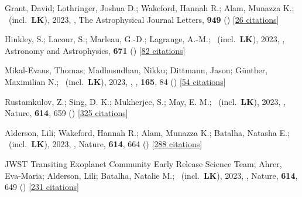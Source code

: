 \item[{\color{numcolor}\scriptsize87}] Grant, David; Lothringer, Joshua D.; Wakeford, Hannah R.; Alam, Munazza K.; \etal\ (incl.\ \textbf{LK}), 2023, , The Astrophysical Journal Letters, \textbf{949} () [\href{https://ui.adsabs.harvard.edu/abs/2023ApJ...949L..15G}{26 citations}]

\item[{\color{numcolor}\scriptsize86}] Hinkley, S.; Lacour, S.; Marleau, G.-D.; Lagrange, A.-M.; \etal\ (incl.\ \textbf{LK}), 2023, , Astronomy and Astrophysics, \textbf{671} () [\href{https://ui.adsabs.harvard.edu/abs/2023A&A...671L...5H}{82 citations}]

\item[{\color{numcolor}\scriptsize85}] Mikal-Evans, Thomas; Madhusudhan, Nikku; Dittmann, Jason; G{\"u}nther, Maximilian N.; \etal\ (incl.\ \textbf{LK}), 2023, , \aj, \textbf{165}, 84 () [\href{https://ui.adsabs.harvard.edu/abs/2023AJ....165...84M}{54 citations}]

\item[{\color{numcolor}\scriptsize84}] Rustamkulov, Z.; Sing, D. K.; Mukherjee, S.; May, E. M.; \etal\ (incl.\ \textbf{LK}), 2023, , Nature, \textbf{614}, 659 () [\href{https://ui.adsabs.harvard.edu/abs/2023Natur.614..659R}{325 citations}]

\item[{\color{numcolor}\scriptsize83}] Alderson, Lili; Wakeford, Hannah R.; Alam, Munazza K.; Batalha, Natasha E.; \etal\ (incl.\ \textbf{LK}), 2023, , Nature, \textbf{614}, 664 () [\href{https://ui.adsabs.harvard.edu/abs/2023Natur.614..664A}{288 citations}]

\item[{\color{numcolor}\scriptsize82}] JWST Transiting Exoplanet Community Early Release Science Team; Ahrer, Eva-Maria; Alderson, Lili; Batalha, Natalie M.; \etal\ (incl.\ \textbf{LK}), 2023, , Nature, \textbf{614}, 649 () [\href{https://ui.adsabs.harvard.edu/abs/2023Natur.614..649J}{231 citations}]

